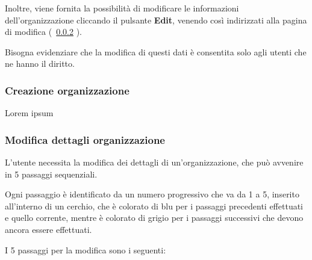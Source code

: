 \documentclass[../manuale-utente.tex]{subfiles}
\begin{document}
Inoltre, viene fornita la possibilità di modificare le informazioni dell'organizzazione cliccando il pulsante \textbf{Edit}, venendo così indirizzati alla pagina di modifica (~\ref{subs:modififica_dettagli_organizzazione} ). 

Bisogna evidenziare che la modifica di questi dati è consentita solo agli utenti che ne hanno il diritto.
\newpage


\subsubsection{Creazione organizzazione}%
\label{subs:creazione_organizzazione}


Lorem ipsum
\newpage

\subsubsection{Modifica dettagli organizzazione}%
\label{subs:modififica_dettagli_organizzazione}

L'utente necessita la modifica dei dettagli di un'organizzazione, che può avvenire in 5 passaggi sequenziali. 

Ogni passaggio è identificato da un numero progressivo che va da 1 a 5, inserito all'interno di un cerchio, che è colorato di blu per i passaggi precedenti effettuati e quello corrente, mentre è colorato di grigio per i passaggi successivi che devono ancora essere effettuati.

I 5 passaggi per la modifica sono i seguenti:
\end{document}

